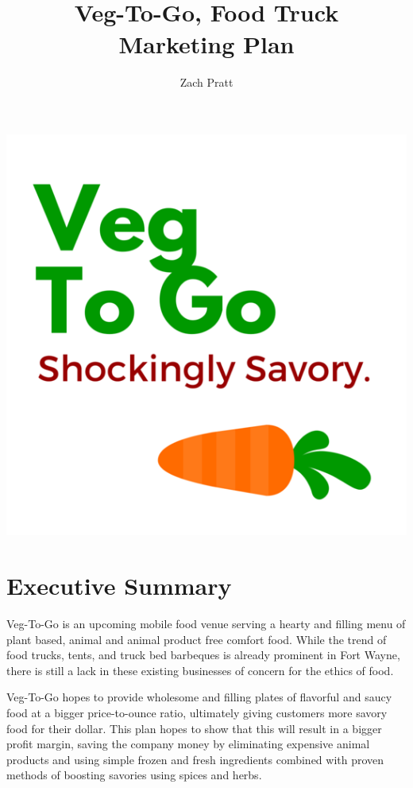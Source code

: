 \documentclass[12pt, letterpaper]{article}
\newcommand{\companyname}{Veg-To-Go}
\begin{document}
\includegraphics[width=\textwidth]{VegToGoLogo}

\newpage{}

\title{\companyname{},\textsuperscript{\textregistered} Food Truck\\ Marketing Plan}
\author{Zach Pratt}
\maketitle

\newpage

\renewcommand\contentsname{Table of Contents}
\renewcommand{\cftsecleader}{\cftdotfill{\cftdotsep}}
\tableofcontents

\newpage

\section{Executive Summary}
Veg-To-Go is an upcoming mobile food venue serving a hearty and filling menu of plant based, animal and animal product free comfort food.  While the trend of food trucks, tents, and truck bed barbeques is already prominent in Fort Wayne, there is still a lack in these existing businesses of concern for the ethics of food.

Veg-To-Go hopes to provide wholesome and filling plates of flavorful and saucy food at a bigger price-to-ounce ratio, ultimately giving customers more savory food for their dollar.  This plan hopes to show that this will result in a bigger profit margin, saving the company money by eliminating expensive animal products and using simple frozen and fresh ingredients combined with proven methods of boosting savories using spices and herbs.
\end{document}
